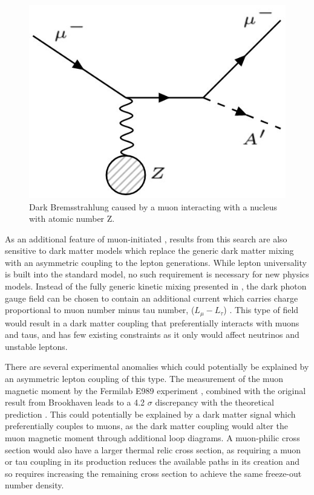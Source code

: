 \begin{figure}[ht]
	\centering
	\label{fig:dbrem_feyn}
	\includegraphics[width=\textwidth]{figures/dbrem_feyn_diagram.jpg}
        \caption[Dark Bremsstrahlung Feynman Diagram]{Dark Bremsstrahlung caused by a muon interacting with a nucleus with atomic number Z.}
\end{figure}

As an additional feature of muon-initiated \dbrem, results from this search are also sensitive to dark matter models which replace the generic dark matter mixing with an asymmetric coupling to the lepton generations.
While lepton universality is built into the standard model, no such requirement is necessary for new physics models. 
Instead of the fully generic kinetic mixing presented in , the dark photon gauge field can be chosen to contain an additional current which carries charge proportional to muon number minus tau number, ($L_\mu - L_\tau$) \cite{neut_trident}.
This type of field would result in a dark matter coupling that preferentially interacts with muons and taus, and has few existing constraints as it only would affect neutrinos and unstable leptons.

There are several experimental anomalies which could potentially be explained by an asymmetric lepton coupling of this type.
The measurement of the muon magnetic moment by the Fermilab E989 experiment \cite{gminus2}, combined with the original result from Brookhaven \cite{gminus2_bnl} leads to a 4.2 $\sigma$ discrepancy with the theoretical prediction \cite{gminus2_theory}. 
This could potentially be explained by a dark matter signal which preferentially couples to muons, as the dark matter coupling would alter the muon magnetic moment through additional loop diagrams.
A muon-philic cross section would also have a larger thermal relic cross section, as requiring a muon or tau coupling in its production reduces the available paths in its creation and so requires increasing the remaining cross section to achieve the same freeze-out number density.

